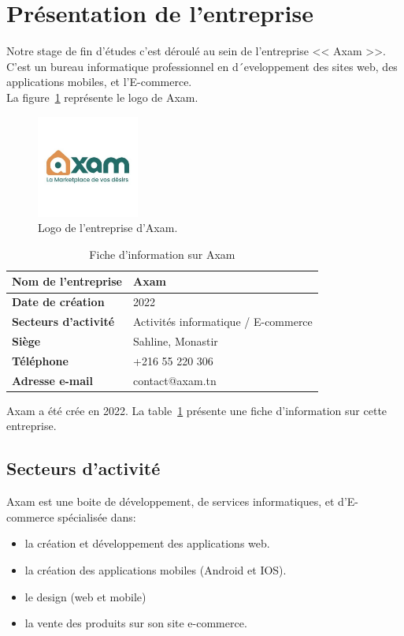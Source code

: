 \section{Présentation de l'entreprise}
\noindent
\large
Notre stage de fin d'études c'est déroulé au sein de l'entreprise << Axam >>. C'est un bureau informatique professionnel en d´eveloppement des sites web, des applications mobiles, et l'E-commerce. \\
La figure~\ref{fig:axam} représente le logo de Axam.
\begin{figure}[H]
\centering
\includegraphics[width=0.3\textwidth]{logos/axam.png}
\caption{Logo de l'entreprise d'Axam.}
\label{fig:axam}
\end{figure}

\begin{table}[H]
\centering %
\begin{tabular}{|>{\bfseries}m{5cm}|m{8cm}|}
\hline
\rowcolor{blue!20} %
Nom de l’entreprise & Axam \\
\hline
Date de création & 2022 \\
\hline
Secteurs d’activité & Activités informatique / E-commerce\\
\hline
Siège & Sahline, Monastir \\
\hline
Téléphone & +216 55 220 306 \\
\hline
Adresse e-mail & contact@axam.tn \\
\hline
\end{tabular}
\caption{Fiche d’information sur Axam}
\label{tab:axam}
\end{table}
\noindent
Axam a été crée en 2022. La table~\ref{tab:axam} présente une fiche d’information sur cette entreprise.

\subsection{Secteurs d’activité}
\noindent
Axam est une boite de développement, de services informatiques, et d'E-commerce spécialisée dans:
\begin{itemize}
    \item la création et développement des applications web.
    \item la création des applications mobiles (Android et IOS).
    \item le design (web et mobile)
    \item la vente des produits sur son site e-commerce.
\end{itemize}